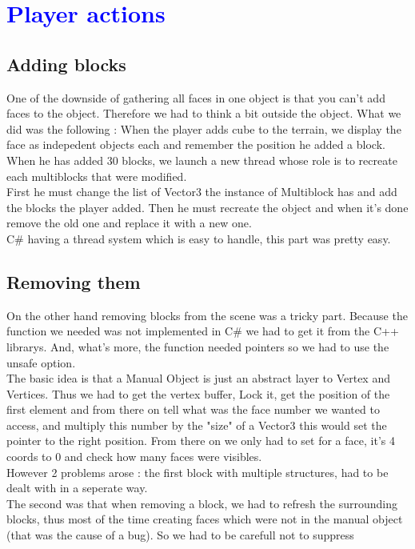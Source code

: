 \documentclass[article]{report} %
\begin{document}
		\chapter{\textcolor{blue}{Player actions}}
			\section{Adding blocks}
				One of the downside of gathering all faces in one object is that you can't add faces to the object. Therefore we had to think a bit outside the object. What we did was the following : When the player adds cube to the terrain, we display the face as indepedent objects each and remember the position he added a block. When he has added 30 blocks, we launch a new thread whose role is to recreate each multiblocks that were modified.\\

		First he must change the list of Vector3 the instance of Multiblock has and add the blocks the player added. Then he must recreate the object and when it's done remove the old one and replace it with a new one.\\

		C\# having a thread system which is easy to handle, this part was pretty easy.
				
			\section{Removing them}
				On the other hand removing blocks from the scene was a tricky part. Because the function we needed was not implemented in C\# we had to get it from the C++ librarys. And, what's more, the function needed pointers so we had to use the unsafe option.\\
The basic idea is that a Manual Object is just an abstract layer to Vertex and Vertices. Thus we had to get the vertex buffer, Lock it, get the position of the first element and from there on tell what was the face number we wanted to access, and multiply this number by the "size" of a Vector3 this would set the pointer to the right position. From there on we only had to set for a face, it's 4 coords to 0 and check how many faces were visibles.\\

However 2 problems arose : the first block with multiple structures, had to be dealt with in a seperate way. \\
The second was that when removing a block, we had to refresh the surrounding blocks, thus most of the time creating faces which were not in the manual object (that was the cause of a bug). So we had to be carefull not to suppress 
\end{document}
